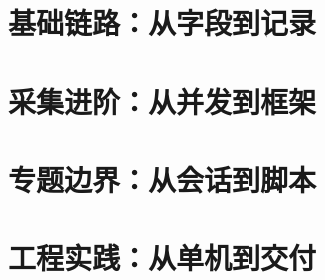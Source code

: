 \documentclass[UTF8,11pt,openany,fontset=none]{ctexbook}
\begin{document}
\frontmatter



\booktableofcontents
\mainmatter
\part{基础链路：从字段到记录}







\part{采集进阶：从并发到框架}







\part{专题边界：从会话到脚本}





\part{工程实践：从单机到交付}



\appendix




\end{document}
